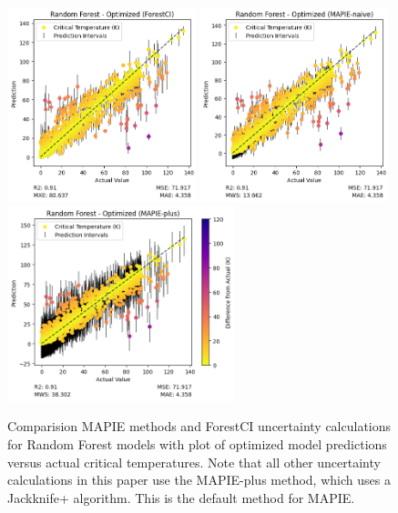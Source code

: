 \documentclass[twocolumn, nofootinbib, secnumarabic, amssymb, nobibnotes, aps, prd]{revtex4-2}
\begin{document}
\begin{figure}[!h]
   \centering
   \includegraphics[height=2.23in]{images/subfigures/random_forest_optimized_forestci.png} \nolinebreak
   \includegraphics[height=2.23in]{images/subfigures/random_forest_optimized_mapie-naive.png} \nolinebreak
   \includegraphics[height=2.23in]{images/subfigures/random_forest_optimized_mapie-plus.png}
   \caption{Comparision MAPIE methods and ForestCI uncertainty calculations for Random Forest models with plot of optimized model predictions versus actual critical temperatures. Note that all other uncertainty calculations in this paper use the MAPIE-plus method, which uses a Jackknife+ algorithm. This is the default method for MAPIE.}
\end{figure}\label{fig:mapie-forestci}
\end{document}
